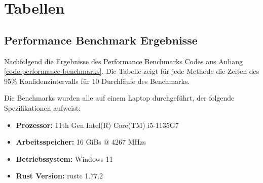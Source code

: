 \chapter{Tabellen}
\label{anhang:chapter-tabellen}

\section{Performance Benchmark Ergebnisse}
\label{anhang:section-tabellen-benchmark}

Nachfolgend die Ergebnisse des Performance Benchmarks Codes aus Anhang \ref{code:performance-benchmarks}. Die Tabelle zeigt für jede Methode die Zeiten des $95\%$ Konfidenzintervalls für 10 Durchläufe des Benchmarks.

Die Benchmarks wurden alle auf einem Laptop durchgeführt, der folgende Spezifikationen aufweist:

\begin{itemize}
    \item \vspace{-0.1cm} \textbf{Prozessor:} 11th Gen Intel(R) Core(TM) i5-1135G7
    \item \vspace{-0.1cm} \textbf{Arbeitsspeicher:} 16 \acsp{GiB} @ 4267 \acsp{MHz}
    \item \vspace{-0.1cm} \textbf{Betriebssystem:} Windows 11
    \item \vspace{-0.1cm} \textbf{Rust Version:} rustc 1.77.2
\end{itemize}

\vspace*{1.25cm}




